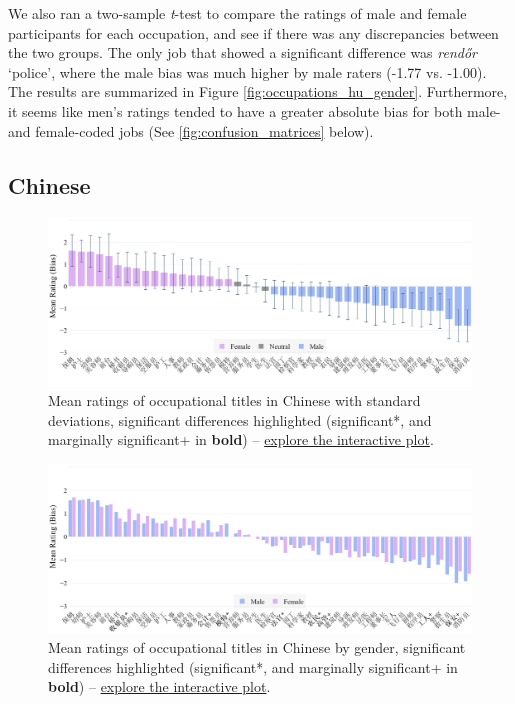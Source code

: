 \documentclass[11pt]{article}
\begin{document}
We also ran a two-sample \textit{t}-test to compare the ratings of male and female participants for each occupation, and see if there was any discrepancies between the two groups. The only job that showed a significant difference was \textit{rendőr} `police', where the male bias was much higher by male raters (-1.77 vs. -1.00). The results are summarized in Figure \ref{fig:occupations_hu_gender}. Furthermore, it seems like men's ratings tended to have a greater absolute bias for both male- and female-coded jobs (See \ref{fig:confusion_matrices} below).



\subsection{Chinese}

\begin{figure}[!ht]
  \centering
  \includegraphics[width=\linewidth]{../occupations_zh}
  \caption{Mean ratings of occupational titles in Chinese with standard deviations, significant differences highlighted (significant*, and marginally significant+ in \textbf{bold}) -- \href{https://htmlpreview.github.io/?https://github.com/partigabor/occupational-bias/blob/main/occupations_zh.html}{explore the interactive plot}.}
  \label{fig:occupations_zh}
\end{figure}

\begin{figure}[!b]
  \centering
  \includegraphics[width=\linewidth]{../occupations_zh_gender}
  \caption{Mean ratings of occupational titles in Chinese by gender, significant differences highlighted (significant*, and marginally significant+ in \textbf{bold}) -- \href{https://htmlpreview.github.io/?https://github.com/partigabor/occupational-bias/blob/main/occupations_zh_gender.html}{explore the interactive plot}.}
  \label{fig:occupations_zh_gender}
\end{figure}
\end{document}
